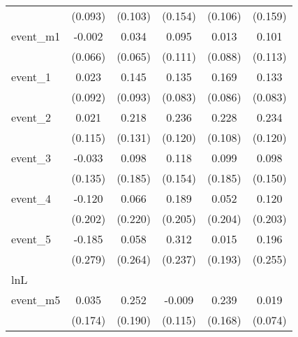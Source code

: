 {\begin{tabular}{l*{5}{c}}
            &     (0.093)         &     (0.103)         &     (0.154)         &     (0.106)         &     (0.159)         \\
[1em]
event\_m1    &      -0.002         &       0.034         &       0.095         &       0.013         &       0.101         \\
            &     (0.066)         &     (0.065)         &     (0.111)         &     (0.088)         &     (0.113)         \\
[1em]
event\_1     &       0.023         &       0.145         &       0.135         &       0.169\sym{*}  &       0.133         \\
            &     (0.092)         &     (0.093)         &     (0.083)         &     (0.086)         &     (0.083)         \\
[1em]
event\_2     &       0.021         &       0.218         &       0.236\sym{*}  &       0.228\sym{*}  &       0.234         \\
            &     (0.115)         &     (0.131)         &     (0.120)         &     (0.108)         &     (0.120)         \\
[1em]
event\_3     &      -0.033         &       0.098         &       0.118         &       0.099         &       0.098         \\
            &     (0.135)         &     (0.185)         &     (0.154)         &     (0.185)         &     (0.150)         \\
[1em]
event\_4     &      -0.120         &       0.066         &       0.189         &       0.052         &       0.120         \\
            &     (0.202)         &     (0.220)         &     (0.205)         &     (0.204)         &     (0.203)         \\
[1em]
event\_5     &      -0.185         &       0.058         &       0.312         &       0.015         &       0.196         \\
            &     (0.279)         &     (0.264)         &     (0.237)         &     (0.193)         &     (0.255)         \\
\hline
lnL         &                     &                     &                     &                     &                     \\
event\_m5    &       0.035         &       0.252         &      -0.009         &       0.239         &       0.019         \\
            &     (0.174)         &     (0.190)         &     (0.115)         &     (0.168)         &     (0.074)         \\

\end{tabular}}
